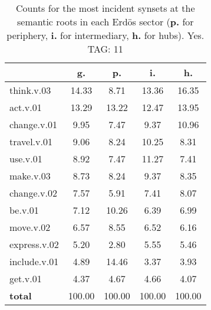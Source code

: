 \begin{table}[h!]
\begin{center}
\begin{tabular}{| l | c | c | c | c |}\hline
 & g. & p. & i. & h. \\\hline
think.v.03 & 14.33  & 8.71  & 13.36  & 16.35 \\\hline
act.v.01 & 13.29  & 13.22  & 12.47  & 13.95 \\\hline
change.v.01 & 9.95  & 7.47  & 9.37  & 10.96 \\\hline
travel.v.01 & 9.06  & 8.24  & 10.25  & 8.31 \\\hline
use.v.01 & 8.92  & 7.47  & 11.27  & 7.41 \\\hline
make.v.03 & 8.73  & 8.24  & 9.37  & 8.35 \\\hline
change.v.02 & 7.57  & 5.91  & 7.41  & 8.07 \\\hline
be.v.01 & 7.12  & 10.26  & 6.39  & 6.99 \\\hline
move.v.02 & 6.57  & 8.55  & 6.52  & 6.16 \\\hline
express.v.02 & 5.20  & 2.80  & 5.55  & 5.46 \\\hline
include.v.01 & 4.89  & 14.46  & 3.37  & 3.93 \\\hline
get.v.01 & 4.37  & 4.67  & 4.66  & 4.07 \\\hline
{{\bf total}} & 100.00  & 100.00  & 100.00  & 100.00 \\\hline
\end{tabular}
\caption{Counts for the most incident synsets at the semantic roots in each Erd\"os sector ({\bf p.} for periphery, {\bf i.} for intermediary, {\bf h.} for hubs). Yes. TAG: 11}
\end{center}
\end{table}